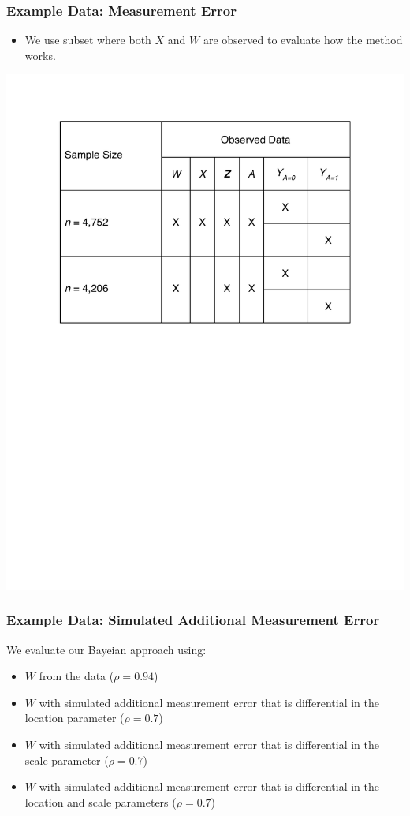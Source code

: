\documentclass{beamer}
\begin{document}
\begin{frame}


\frametitle{ Example Data: Measurement Error}


\begin{itemize}
\item We use subset where both $X$ and $W$ are observed to evaluate how the method works.
\end{itemize}

\centering
\includegraphics[width=\textwidth,height=0.7\textheight,keepaspectratio]{observeddata}


\end{frame} 

\begin{frame}

\frametitle{ Example Data: Simulated Additional Measurement Error}

We evaluate our Bayeian approach using:
\begin{itemize}
\item $W$ from the data ($\rho=0.94$)
\item $W$ with simulated additional measurement error that is differential in the location parameter ($\rho=0.7$)
\item $W$ with simulated additional measurement error that is differential in the scale parameter ($\rho=0.7$)
 \item $W$ with simulated additional measurement error that is differential in the location and scale parameters ($\rho=0.7$)
\end{itemize}
 


\end{frame} 
\end{document}
